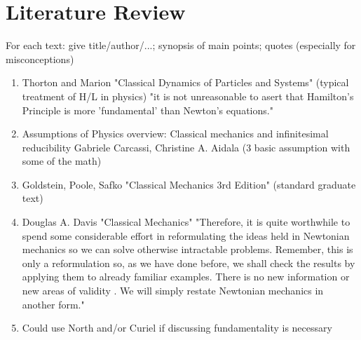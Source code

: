 \documentclass{article}
\begin{document}
\section{Literature Review}
For each text: give title/author/...; synopsis of main points; quotes (especially for misconceptions)

\begin{enumerate}
\item Thorton and Marion "Classical Dynamics of Particles and Systems"
(typical treatment of H/L in physics)
"it is not unreasonable to asert that Hamilton's Principle is more 'fundamental' than Newton's equations."
\item Assumptions of Physics overview:
Classical mechanics and infinitesimal reducibility
Gabriele Carcassi, Christine A. Aidala (3 basic assumption with some of the math)
\item Goldstein, Poole, Safko "Classical Mechanics 3rd Edition"
(standard graduate text)
\item Douglas A. Davis "Classical Mechanics"
"Therefore, it is quite worthwhile to spend some considerable effort in reformulating the ideas held in Newtonian mechanics so we can solve otherwise intractable problems. Remember, this is only a reformulation so, as we have done before, we shall check the results by applying them to already familiar examples. There is no new information or new areas of validity . We will simply restate Newtonian mechanics in another form."
\item Could use North and/or Curiel if discussing fundamentality is necessary

\end{enumerate}
\end{document}
